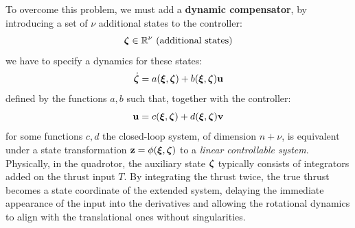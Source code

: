 \documentclass[10pt, a4paper]{report}
\begin{document}
To overcome this problem, we must add a \textbf{dynamic compensator}, by introducing a set of $\nu$ additional states to the controller:\begin{equation}
    {\boldsymbol{\zeta}}\in{\mathbb R}^\nu \text{ (additional states)}
\end{equation}
we have to specify a dynamics for these states:\begin{equation}
    \dot{{\boldsymbol{\zeta}}}=a({\boldsymbol{\xi}},{\boldsymbol{\zeta}})+b({\boldsymbol{\xi}},{\boldsymbol{\zeta}})\mathbf u 
\end{equation}
defined by the functions $a,b$ such that, together with the controller:\begin{equation}
    \mathbf u=c({\boldsymbol{\xi}},{\boldsymbol{\zeta}})+d({\boldsymbol{\xi}},{\boldsymbol{\zeta}})\mathbf v 
\end{equation}
for some functions $c,d$ the closed-loop system, of dimension $n+\nu$, is
equivalent under a state transformation $\mathbf z=\phi({\boldsymbol{\xi}},{\boldsymbol{\zeta}})$ to a \textit{linear
controllable system}. Physically, in the quadrotor, the auxiliary state ${\boldsymbol{\zeta}}$ typically consists of integrators added on the thrust input $T$. By integrating the thrust  twice, the true thrust becomes a state coordinate of the extended system, delaying the immediate appearance of the input into the derivatives and allowing the rotational dynamics to align with the translational ones without singularities. \bigskip
\end{document}
